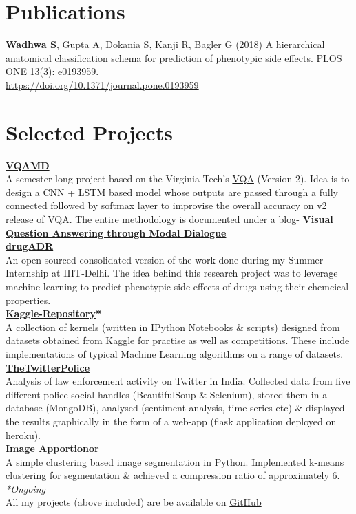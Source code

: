 \documentclass[margin,line]{res}
\begin{document}
\begin{resume}
\section{\sc Publications}
{\bf Wadhwa S}, Gupta A, Dokania S, Kanji R, Bagler G (2018) A hierarchical anatomical classification schema for prediction of phenotypic side effects. PLOS ONE 13(3): e0193959. 
\\{\href{https://doi.org/10.1371/journal.pone.0193959}{\color{blue}https://doi.org/10.1371/journal.pone.0193959}}

\section{\sc Selected Projects}
{\bf {\href{https://github.com/sominwadhwa/VQAMD}{\color{blue} VQAMD}}}\\
A semester long project based on the Virginia Tech's {\href{http://visualqa.org/}{\color{blue} VQA}} (Version 2). Idea is to design a CNN + LSTM based model whose outputs are passed through a fully connected followed by softmax layer to improvise the overall accuracy on v2 release of VQA. The entire methodology is documented under a blog- {\bf {\href{http://www.swadhwa.me/blog/2018/01/01/de/}{\color{blue} Visual Question Answering through Modal Dialogue}}}\\
{\bf {\href{https://github.com/sominwadhwa/drugADR}{\color{blue} drugADR}}}\\
An open sourced consolidated version of the work done during my Summer Internship at IIIT-Delhi. The idea behind this research project was to leverage machine learning to predict phenotypic side effects of drugs using their chemcical properties.\\
{\bf {\href{https://github.com/sominwadhwa/Kaggle}{\color{blue} Kaggle-Repository}*}}\\
A collection of kernels (written in IPython Notebooks \& scripts) designed from datasets obtained from Kaggle for practise as well as competitions. These include implementations of typical Machine Learning algorithms on a range of datasets.\\
{\bf {\href{https://github.com/sominwadhwa/TheTwitterPolice}{\color{blue} TheTwitterPolice}}}\\
Analysis of law enforcement activity on Twitter in India. Collected data from five different police social handles (BeautifulSoup \& Selenium), stored them in a database (MongoDB), analysed (sentiment-analysis, time-series etc) \& displayed the results graphically in the form of a web-app (flask application deployed on heroku).\\
{\bf {\href{https://github.com/sominwadhwa/Image-Apportionor}{\color{blue} Image Apportionor}}}\\
A simple clustering based image segmentation in Python. Implemented k-means clustering for segmentation \& achieved a compression ratio of approximately 6.\\
\textit{*Ongoing}\\
All my projects (above included) are be available on {\href{https://github.com/sominwadhwa}{\color{blue}GitHub}}


\end{resume}
\end{document}

